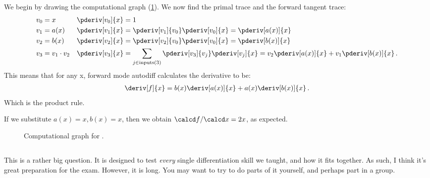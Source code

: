 \subsection{}
We begin by drawing the computational graph (\cref{fig:qproductrule-compgraph}). %
We now find the primal trace and the forward tangent trace:
\begin{align}
v_0 &= x && \pderiv[v_0]{x} = 1 \\
v_1 &= a(x) && \pderiv[v_1]{x} = \pderiv[v_1]{v_0}\pderiv[v_0]{x} = \pderiv[a(x)]{x} \\
v_2 &= b(x) && \pderiv[v_2]{x} = \pderiv[v_2]{v_0}\pderiv[v_0]{x} = \pderiv[b(x)]{x} \\
v_3 &= v_1 \cdot v_2 && \pderiv[v_3]{x} = \sum_{j \in \mathrm{inputs}(3)}\pderiv[v_3]{v_j}\pderiv[v_j]{x} = v_2\pderiv[a(x)]{x} + v_1\pderiv[b(x)]{x} \,.
\end{align}
This means that for any x, forward mode autodiff calculates the derivative to be:
\begin{align}
\deriv[f]{x} = b(x)\deriv[a(x)]{x} + a(x)\deriv[b(x)]{x} \,.
\end{align}
Which is the product rule.

If we substitute $a(x) = x, b(x) = x$, then we obtain $\calcd f / \calcd x = 2x$, as expected.


\begin{figure}[t]
\centering
\caption{Computational graph for .}
\label{fig:qproductrule-compgraph}
\end{figure}



\subsection{}
This is a rather big question. It is designed to test \emph{every} single differentiation skill we taught, and how it fits together. As such, I think it's great preparation for the exam. However, it is long. You may want to try to do parts of it yourself, and perhaps part in a group.

